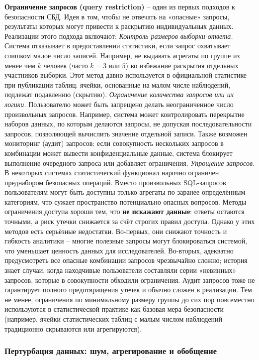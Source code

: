 \textbf{Ограничение запросов (query restriction)} – один из первых подходов к безопасности СБД. Идея в том, чтобы не отвечать на «опасные» запросы, результаты которых могут привести к раскрытию индивидуальных данных. Реализации этого подхода включают:
\textit{Контроль размеров выборки ответа.} Система отказывает в предоставлении статистики, если запрос охватывает слишком малое число записей. Например, не выдавать агрегаты по группе из менее чем $k$ человек (часто $k=3$ или $5$) во избежание раскрытия отдельных участников выборки. Этот метод давно используется в официальной статистике при публикации таблиц: ячейки, основанные на малом числе наблюдений, подлежат подавлению (скрытию).
\textit{Ограничение количества запросов или их логики.} Пользователю может быть запрещено делать неограниченное число произвольных запросов. Например, система может контролировать перекрытие наборов данных, по которым делаются запросы, не допуская последовательности запросов, позволяющей вычислить значение отдельной записи. Также возможен мониторинг (аудит) запросов: если совокупность нескольких запросов в комбинации может вывести конфиденциальные данные, система блокирует выполнение очередного запроса или добавляет ограничения.
\textit{Упрощение запросов.} В некоторых системах статистический функционал нарочно ограничен преднабором безопасных операций. Вместо произвольных SQL-запросов пользователям могут быть доступны только агрегаты по заранее определённым категориям, что сужает пространство потенциально опасных вопросов.
Методы ограничения доступа хороши тем, что \textbf{не искажают данные}: ответы остаются точными, а риск утечки снижается за счёт строгих правил доступа. Однако у этих методов есть серьёзные недостатки. Во-первых, они снижают точность и гибкость аналитики – многие полезные запросы могут блокироваться системой, что уменьшает ценность данных для исследователей. Во-вторых, адекватно предусмотреть все опасные комбинации запросов чрезвычайно сложно; история знает случаи, когда находчивые пользователи составляли серии «невинных» запросов, которые в совокупности обходили ограничения. Аудит запросов тоже не гарантирует полного предотвращения утечек и обычно сложен в реализации. Тем не менее, ограничения по минимальному размеру группы до сих пор повсеместно используются в статистической практике как базовая мера безопасности (например, ячейки статистических таблиц с малым числом наблюдений традиционно скрываются или агрегируются). \subsubsection{Пертурбация данных: шум, агрегирование и обобщение}
